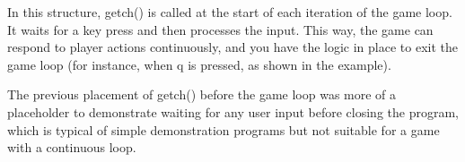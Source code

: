 In this structure, getch() is called at the start of each iteration of the game loop. It waits for a key press and then processes the input. This way, the game can respond to player actions continuously, and you have the logic in place to exit the game loop (for instance, when \textquotesingle{}q\textquotesingle{} is pressed, as shown in the example).

The previous placement of getch() before the game loop was more of a placeholder to demonstrate waiting for any user input before closing the program, which is typical of simple demonstration programs but not suitable for a game with a continuous loop. 